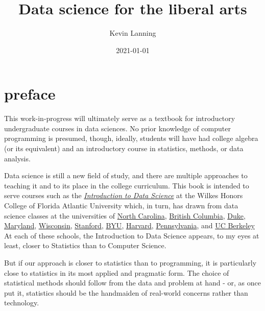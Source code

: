 \documentclass[
  openany]{book}
\title{Data science for the liberal arts}
\author{Kevin Lanning}
\date{2021-01-01}
\begin{document}
\maketitle

{
\hypersetup{linkcolor=}
\setcounter{tocdepth}{1}
\tableofcontents
}
\hypertarget{section}{%
\chapter*{}\label{section}}

\hypertarget{preface}{%
\chapter*{preface}\label{preface}}

This work-in-progress will ultimately serve as a textbook for introductory undergraduate courses in data sciences. No prior knowledge of computer programming is presumed, though, ideally, students will have had college algebra (or its equivalent) and an introductory course in statistics, methods, or data analysis.

Data science is still a new field of study, and there are multiple approaches to teaching it and to its place in the college curriculum. This book is intended to serve courses such as the \href{https://kevinlanning.github.io/DataSciSpring2020/}{\emph{Introduction to Data Science}} at the Wilkes Honors College of Florida Atlantic University which, in turn, has drawn from data science classes at the universities of \href{https://idc9.github.io/stor390/}{North Carolina}, \href{https://github.com/STAT545-UBC/STAT545-UBC.github.io}{British Columbia}, \href{https://www2.stat.duke.edu/courses/Fall15/sta112.01/}{Duke}, \href{http://www.hcbravo.org/IntroDataSci/calendar/}{Maryland}, \href{http://pages.stat.wisc.edu/~yandell/R_for_data_sciences/syllabus.html}{Wisconsin}, \href{https://github.com/dcl-2017-04/curriculum}{Stanford}, \href{https://byuistats.github.io/M335/syllabus.html}{BYU}, \href{http://datasciencelabs.github.io/}{Harvard}, \href{https://github.com/MUSA-620-Spring-2017/Course-Materials}{Pennsylvania}, and \href{https://github.com/FAUDataScience/stat259}{UC Berkeley} At each of these schools, the Introduction to Data Science appears, to my eyes at least, closer to Statistics than to Computer Science.

But if our approach is closer to statistics than to programming, it is particularly close to statistics in its most applied and pragmatic form. The choice of statistical methods should follow from the data and problem at hand - or, as \citep{loevinger1957} once put it, statistics should be the handmaiden of real-world concerns rather than technology.
\end{document}
